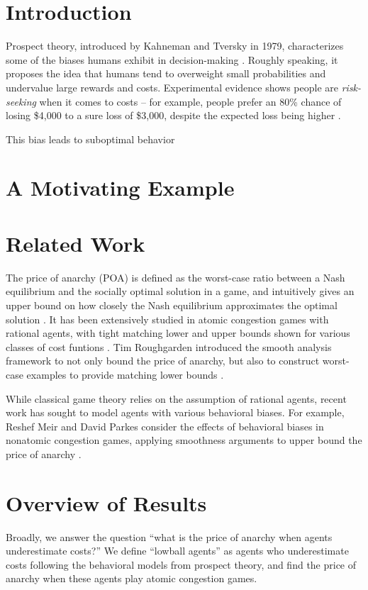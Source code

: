 \documentclass[twoside]{article}
\begin{document}
\begin{multicols}{2} %

\section{Introduction}
Prospect theory, introduced by Kahneman and Tversky in 1979, characterizes some
of the biases humans exhibit in decision-making \cite{Kahneman1979}. Roughly
speaking, it proposes the idea that humans tend to overweight small
probabilities and undervalue large rewards and costs. Experimental evidence
shows people are \textit{risk-seeking} when it comes to costs -- for example,
people prefer an 80\% chance of losing \$4,000 to a sure loss of \$3,000,
despite the expected loss being higher \cite{Kahneman1979}.

This bias leads to suboptimal behavior

\section{A Motivating Example}

\section{Related Work}
The price of anarchy (POA) is defined as the worst-case ratio between a Nash
equilibrium and the socially optimal solution in a game, and intuitively gives
an upper bound on how closely the Nash equilibrium approximates the optimal
solution \cite{Koutsoupias2009}. It has been extensively studied in atomic
congestion games with rational agents, with tight matching lower and upper
bounds shown for various classes of cost funtions \cite{Aland2011}
\cite{Roughgarden2012}. Tim Roughgarden introduced the smooth analysis framework
to not only bound the price of anarchy, but also to construct worst-case
examples to provide matching lower bounds \cite{Roughgarden2012}.

While classical game theory relies on the assumption of rational agents, recent
work has sought to model agents with various behavioral biases. For example,
Reshef Meir and David Parkes consider the effects of behavioral biases in
nonatomic congestion games, applying smoothness arguments to upper bound the
price of anarchy \cite{Meir2014}.

\section{Overview of Results}
Broadly, we answer the question ``what is the price of anarchy when agents
underestimate costs?'' We define ``lowball agents'' as agents who underestimate
costs following the behavioral models from prospect theory, and find the price
of anarchy when these agents play atomic congestion games.


\end{multicols}
\end{document}
